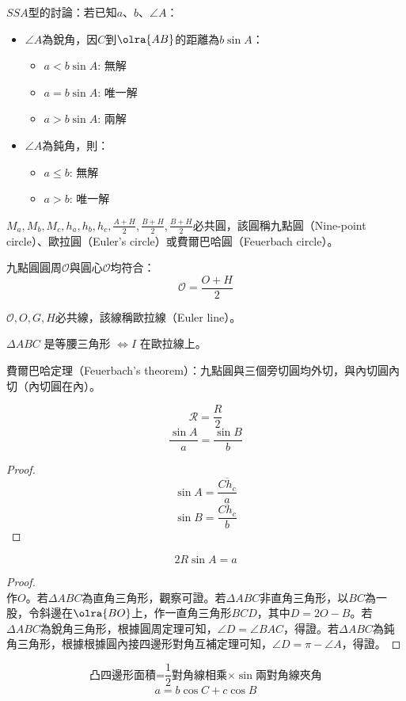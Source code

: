\documentclass[a4paper,12pt]{report}
\begin{document}
$SSA$型的討論：若已知$a$、$b$、$\angle A$：
\begin{itemize}
\item $\angle A$為銳角，因$C$到$\olra{AB}$的距離為$b\sin A$：
\begin{itemize}
\item $a<b\sin A$: 無解
\item $a=b\sin A$: 唯一解
\item $a>b\sin A$: 兩解
\end{itemize}
\item $\angle A$為鈍角，則：
\begin{itemize}
\item $a\leq b$: 無解
\item $a>b$: 唯一解
\end{itemize}
\end{itemize}
\bit
\item $M_a,M_b,M_c,h_a,h_b,h_c,\frac{A+H}{2},\frac{B+H}{2},\frac{B+H}{2}$必共圓，該圓稱九點圓（Nine-point circle）、歐拉圓（Euler's circle）或費爾巴哈圓（Feuerbach circle）。
\item 九點圓圓周$\mathscr{O}$與圓心$\mathscr{O}$均符合：
\[\mathscr{O}=\frac{O+H}{2}\]
\item $\mathscr{O},O,G,H$必共線，該線稱歐拉線（Euler line）。
\item $\Delta ABC$ 是等腰三角形 $\iff I$ 在歐拉線上。
\item 費爾巴哈定理（Feuerbach's theorem）：九點圓與三個旁切圓均外切，與內切圓內切（內切圓在內）。
\item \[\mathscr{R}=\frac{R}{2}\]
\eit
{}
\[\frac{\sin A}{a}=\frac{\sin B}{b}\]
\begin{proof}
\[\sin A=\frac{\overline{Ch_c}}{a}\]
\[\sin B=\frac{\overline{Ch_c}}{b}\]
\end{proof}
\[2R\sin A =a\]
\begin{proof}\mbox{}\\
作$O$。若$\Delta ABC$為直角三角形，觀察可證。若$\Delta ABC$非直角三角形，以$BC$為一股，令斜邊在$\olra{BO}$上，作一直角三角形$BCD$，其中$D=2O-B$。若$\Delta ABC$為銳角三角形，根據圓周定理可知，$\angle D = \angle BAC$，得證。若$\Delta ABC$為鈍角三角形，根據根據圓內接四邊形對角互補定理可知，$\angle D = \pi- \angle A$，得證。
\end{proof}
\[\text{凸四邊形面積=$\frac{1}{2}$對角線相乘$\times\sin$兩對角線夾角}\]
\[a=b\cos C+c\cos B\]
\end{document}

